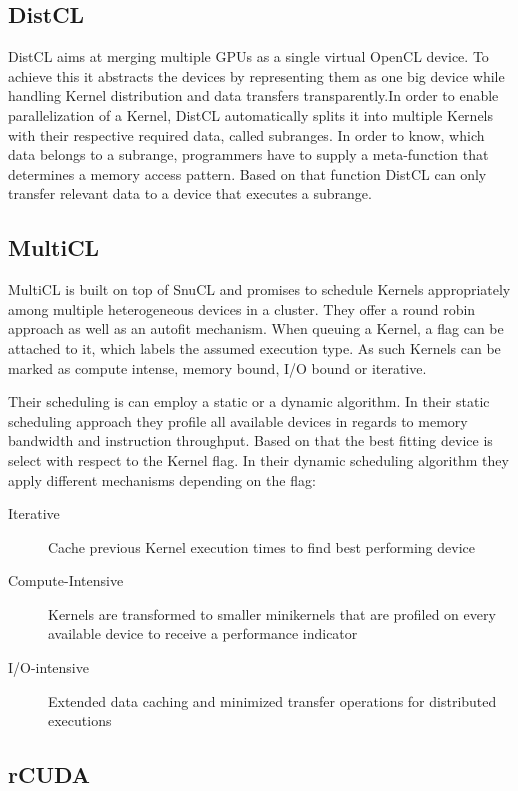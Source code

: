 \subsection*{DistCL}
DistCL aims at merging multiple GPUs as a single virtual OpenCL device\cite{distcl}. To achieve this it abstracts the devices by representing them as one big device while handling Kernel distribution and data transfers transparently.In order to enable parallelization of a Kernel, DistCL automatically splits it into multiple Kernels with their respective required data, called subranges. In order to know, which data belongs to a subrange, programmers have to supply a meta-function that determines a memory access pattern. Based on that function DistCL can only transfer relevant data to a device that executes a subrange.

\subsection*{MultiCL}

MultiCL is built on top of SnuCL and promises to schedule Kernels appropriately among multiple heterogeneous devices in a cluster\cite{multicl}. They offer a round robin approach as well as an autofit mechanism. When queuing a Kernel, a flag can be attached to it, which labels the assumed execution type. As such Kernels can be marked as compute intense, memory bound, I/O bound or iterative.

Their scheduling is can employ a static or a dynamic algorithm. In their static scheduling approach they profile all available devices in regards to memory bandwidth and instruction throughput. Based on that the best fitting device is select with respect to the Kernel flag. In their dynamic scheduling algorithm they apply different mechanisms depending on the flag:

\begin{description}
\item [Iterative] Cache previous Kernel execution times to find best performing device
\item [Compute-Intensive] Kernels are transformed to smaller minikernels that are profiled on every available device to receive a performance indicator
\item [I/O-intensive] Extended data caching and minimized transfer operations for distributed executions
\end{description}

\subsection*{rCUDA}


